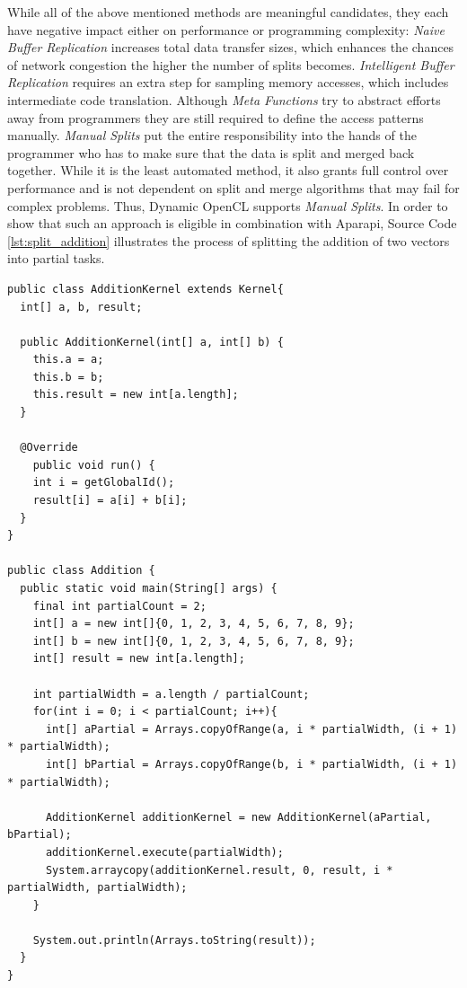 While all of the above mentioned methods are meaningful candidates, they each have negative impact either on performance or programming complexity: \textit{Naive Buffer Replication} increases total data transfer sizes, which enhances the chances of network congestion the higher the number of splits becomes. \textit{Intelligent Buffer Replication} requires an extra step for sampling memory accesses, which includes intermediate code translation. Although \textit{Meta Functions} try to abstract efforts away from programmers they are still required to define the access patterns manually. \textit{Manual Splits} put the entire responsibility into the hands of the programmer who has to make sure that the data is split and merged back together. While it is the least automated method, it also grants full control over performance and is not dependent on split and merge algorithms that may fail for complex problems. Thus, Dynamic OpenCL supports \textit{Manual Splits}. In order to show that such an approach is eligible in combination with Aparapi, Source Code \ref{lst:split_addition} illustrates the process of splitting the addition of two vectors into partial tasks.


\begin{lstlisting}[caption=Partial Aparapi Vector Addition Kernel,captionpos=b,label=lst:split_addition]
public class AdditionKernel extends Kernel{
  int[] a, b, result;

  public AdditionKernel(int[] a, int[] b) {
    this.a = a;
    this.b = b;
    this.result = new int[a.length];
  }

  @Override
    public void run() {
    int i = getGlobalId();
    result[i] = a[i] + b[i];
  }
}

public class Addition {
  public static void main(String[] args) {
    final int partialCount = 2;
	int[] a = new int[]{0, 1, 2, 3, 4, 5, 6, 7, 8, 9};
	int[] b = new int[]{0, 1, 2, 3, 4, 5, 6, 7, 8, 9};
	int[] result = new int[a.length];

	int partialWidth = a.length / partialCount;
	for(int i = 0; i < partialCount; i++){
      int[] aPartial = Arrays.copyOfRange(a, i * partialWidth, (i + 1) * partialWidth);
      int[] bPartial = Arrays.copyOfRange(b, i * partialWidth, (i + 1) * partialWidth);

	  AdditionKernel additionKernel = new AdditionKernel(aPartial, bPartial);
      additionKernel.execute(partialWidth);
      System.arraycopy(additionKernel.result, 0, result, i * partialWidth, partialWidth);
	}

	System.out.println(Arrays.toString(result));
  }
}

\end{lstlisting}

